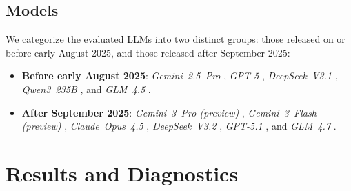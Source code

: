 \documentclass[11pt]{article}
\begin{document}
\subsection{Models}
We categorize the evaluated LLMs into two distinct groups: those released on or before early August 2025, and those released after September 2025:
\begin{itemize}[leftmargin=*, noitemsep, topsep=2pt]
    \item \textbf{Before early August 2025}: \emph{Gemini~2.5~Pro} \citep{deepmind_gemini25pro_modelcard_2025,comanici2025gemini25}, \emph{GPT-5} \citep{openai_gpt5_systemcard_2025}, \emph{DeepSeek~V3.1} \citep{deepseekv3_1_modelcard_2025}, \emph{Qwen3~235B} \citep{yang2025qwen3,qwen3_235b_a22b_instruct_2507}, and \emph{GLM~4.5} \citep{glm45_arc_2025}.
    \item \textbf{After September 2025}: \emph{Gemini~3~Pro (preview)} \citep{deepmind_gemini3pro_modelcard_2025}, \emph{Gemini~3~Flash (preview)} \citep{deepmind_gemini3flash_modelcard_2025}, \emph{Claude~Opus~4.5} \citep{anthropic_claude45_systemcard_2025}, \emph{DeepSeek~V3.2} \citep{deepseekv3_2_technical_report_2025}, \emph{GPT-5.1} \citep{openai_gpt5_1_systemcard_addendum_2025}, and \emph{GLM~4.7} \citep{glm47_modelcard_hf_2025,glm47_techblog_2025}.
\end{itemize}

\section{Results and Diagnostics}\label{sec:3}
\end{document}
